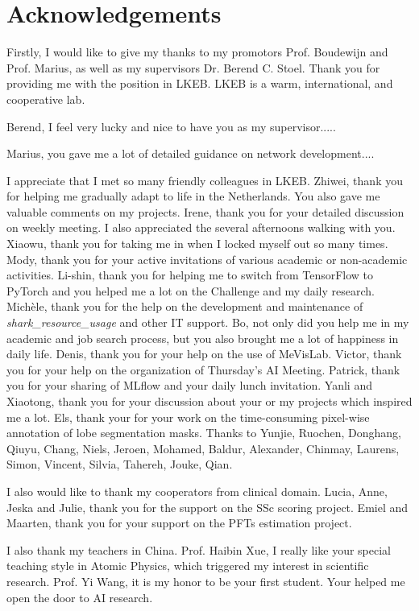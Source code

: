 \chapter{Acknowledgements}
\label{ack}

Firstly, I would like to give my thanks to my promotors Prof. Boudewijn and Prof. Marius, as well as my supervisors Dr. Berend C. Stoel. Thank you for providing me with the position in LKEB. LKEB is a warm, international, and cooperative lab.

Berend, I feel very lucky and nice to have you as my supervisor..... 

Marius, you gave me a lot of detailed guidance on network development....

I appreciate that I met so many friendly colleagues in LKEB. 
Zhiwei, thank you for helping me gradually adapt to life in the Netherlands. You also gave me valuable comments on my projects.
Irene, thank you for your detailed discussion on weekly meeting. I also appreciated the several afternoons walking with you.
Xiaowu, thank you for taking me in when I locked myself out so many times. 
Mody, thank you for your active invitations of various academic or non-academic activities.
Li-shin, thank you for helping me to switch from TensorFlow to PyTorch and you helped me a lot on the Challenge and my daily research.
Michèle, thank you for the help on the development and maintenance of \textit{shark\_resource\_usage} and other IT support. 
Bo, not only did you help me in my academic and job search process, but you also brought me a lot of happiness in daily life. 
Denis, thank you for your help on the use of MeVisLab. 
Victor, thank you for your help on the organization of Thursday's AI Meeting. 
Patrick, thank you for your sharing of MLflow and your daily lunch invitation. 
Yanli and Xiaotong, thank you for your discussion about your or my projects which inspired me a lot.
Els, thank your for your work on the time-consuming pixel-wise annotation of lobe segmentation masks.
Thanks to Yunjie, Ruochen, Donghang, Qiuyu, Chang, Niels, Jeroen, Mohamed, Baldur, Alexander, Chinmay, Laurens, Simon, Vincent, Silvia, Tahereh, Jouke, Qian.

I also would like to thank my cooperators from clinical domain. Lucia, Anne, Jeska and Julie, thank you for the support on the SSc scoring project. Emiel and Maarten, thank you for your support on the PFTs estimation project.

I also thank my teachers in China. Prof. Haibin Xue, I really like your special teaching style in Atomic Physics, which triggered my interest in scientific research. Prof. Yi Wang, it is my honor to be your first student. Your helped me open the door to AI research.

